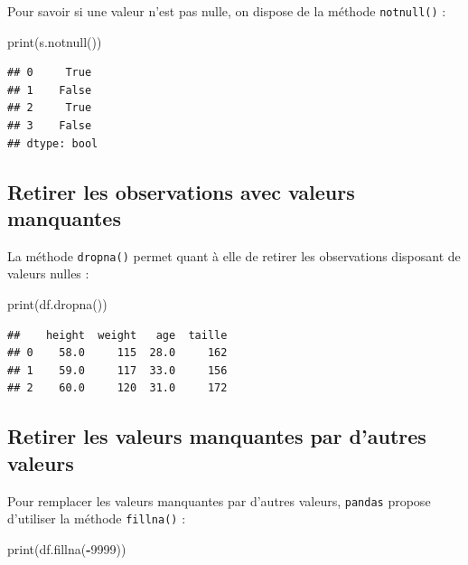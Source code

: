\documentclass[
  12pt,
]{book}
\newenvironment{Shaded}{\begin{snugshade}}{\end{snugshade}}
\newcommand{\BuiltInTok}[1]{#1}
\newcommand{\DecValTok}[1]{\textcolor[rgb]{0.00,0.00,0.81}{#1}}
\newcommand{\NormalTok}[1]{#1}
\newcommand{\OperatorTok}[1]{\textcolor[rgb]{0.81,0.36,0.00}{\textbf{#1}}}
\numberwithin{equation}{section}
\numberwithin{countremarque}{section}
\begin{document}
Pour savoir si une valeur n'est pas nulle, on dispose de la méthode \texttt{notnull()} :

\begin{Shaded}
\begin{Highlighting}[]
\BuiltInTok{print}\NormalTok{(s.notnull())}
\end{Highlighting}
\end{Shaded}

\begin{lstlisting}
## 0     True
## 1    False
## 2     True
## 3    False
## dtype: bool
\end{lstlisting}

\subsection{Retirer les observations avec valeurs manquantes}\label{retirer-les-observations-avec-valeurs-manquantes}

La méthode \texttt{dropna()} permet quant à elle de retirer les observations disposant de valeurs nulles :

\begin{Shaded}
\begin{Highlighting}[]
\BuiltInTok{print}\NormalTok{(df.dropna())}
\end{Highlighting}
\end{Shaded}

\begin{lstlisting}
##    height  weight   age  taille
## 0    58.0     115  28.0     162
## 1    59.0     117  33.0     156
## 2    60.0     120  31.0     172
\end{lstlisting}

\subsection{Retirer les valeurs manquantes par d'autres valeurs}\label{retirer-les-valeurs-manquantes-par-dautres-valeurs}

Pour remplacer les valeurs manquantes par d'autres valeurs, \texttt{pandas} propose d'utiliser la méthode \texttt{fillna()} :

\begin{Shaded}
\begin{Highlighting}[]
\BuiltInTok{print}\NormalTok{(df.fillna(}\OperatorTok{{-}}\DecValTok{9999}\NormalTok{))}
\end{Highlighting}
\end{Shaded}
\end{document}
